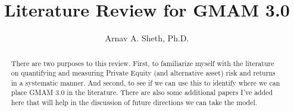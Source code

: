 \documentclass[final,5p,times,twocolumn,authoryear]{elsarticle}
\begin{document}
\begin{frontmatter}



\title{Literature Review for GMAM 3.0}


\author[first]{Arnav A. Sheth, Ph.D.}

\begin{abstract}
There are two purposes to this review. First, to familiarize myself with the literature on quantifying and measuring Private Equity (and alternative asset) risk and returns in a systematic manner. And second, to see if we can use this to identify where we can place GMAM 3.0 in the literature. There are also some additional papers I've added here that will help in the discussion of future directions we can take the model.
\end{abstract}



\end{frontmatter}
\end{document}
